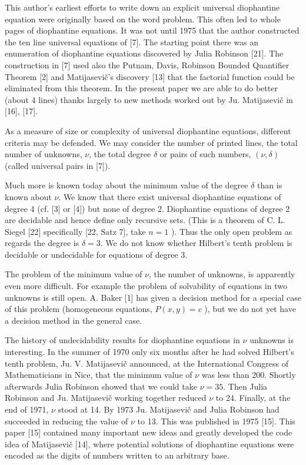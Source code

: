 \documentclass[11pt,a4paper]{article}
\begin{document}
This author's earliest efforts to write down an explicit universal diophantine equation were originally based on the word problem. This often led to whole pages of diophantine equations. It was not until 1975 that the author constructed the ten line universal equations of [7]. The starting point there was an enumeration of diophantine equations discovered by Julia Robinson [21]. The construction in [7] used also the Putnam, Davis, Robinson Bounded Quantifier Theorem [2] and Matijasevič's discovery [13] that the factorial function could be eliminated from this theorem. In the present paper we are able to do better (about 4 lines) thanks largely to new methods worked out by Ju. Matijasevič in [16], [17].

As a measure of size or complexity of universal diophantine equations, different criteria may be defended. We may consider the number of printed lines, the total number of unknowns, $\nu$, the total degree $\delta$ or pairs of such numbers, $(\nu,\allowbreak  \delta)$ (called universal pairs in [7]).

Much more is known today about the minimum value of the degree $\delta$ than is known about $\nu$. We know that there exist universal diophantine equations of degree 4 (cf. [3] or [4]) but none of degree 2. Diophantine equations of degree 2 are decidable and hence define only recursive sets. (This is a theorem of C. L. Siegel [22] specifically [22, Satz 7], take $n=1$ ). Thus the only open problem as regards the degree is $\delta=3$. We do not know whether Hilbert's tenth problem is decidable or undecidable for equations of degree 3.

The problem of the minimum value of $\nu$, the number of unknowns, is apparently even more difficult. For example the problem of solvability of equations in two unknowns is still open. A. Baker [1] has given a decision method for a special case of this problem (homogeneous equations, $P(x,\allowbreak  y)=c$ ), but we do not yet have a decision method in the general case.

The history of undecidability results for diophantine equations in $\nu$ unknowns is interesting. In the summer of 1970 only six months after he had solved Hilbert's tenth problem, Ju. V. Matijasevič announced, at the International Congress of Mathematicians in Nice, that the minimum value of $\nu$ was less than 200. Shortly afterwards Julia Robinson showed that we could take $\nu=35$. Then Julia Robinson and Ju. Matijasevič working together reduced $\nu$ to 24. Finally, at the end of 1971, $\nu$ stood at 14. By 1973 Ju. Matijasevič and Julia Robinson had succeeded in reducing the value of $\nu$ to 13. This was published in 1975 [15]. This paper [15] contained many important new ideas and greatly developed the code idea of Matijasevič [14], where potential solutions of diophantine equations were encoded as the digits of numbers written to an arbitrary base.
\end{document}
